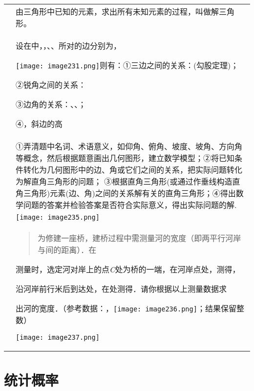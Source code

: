 \begin{longtable}[]{@{}ll@{}}
\toprule
\endhead
&
由三角形中已知的元素，求出所有未知元素的过程，叫做解三角形。\tabularnewline
\begin{minipage}[t]{0.47\columnwidth}\raggedright
\strut
\end{minipage} & \begin{minipage}[t]{0.47\columnwidth}\raggedright
设在中，，、、所对的边分别为，

\texttt{[image: image231.png]}则有：①三边之间的关系：(勾股定理)；

②锐角之间的关系：　

③边角的关系：、、；

④，斜边的高~\strut
\end{minipage}\tabularnewline
&
①弄清题中名词、术语意义，如仰角、俯角、坡度、坡角、方向角等概念，然后根据题意画出几何图形，建立数学模型；②将已知条件转化为几何图形中的边、角或它们之间的关系，把实际问题转化为解直角三角形的问题；
③根据直角三角形(或通过作垂线构造直角三角形)元素(边、角)之间的关系解有关的直角三角形；④得出数学问题的答案并检验答案是否符合实际意义，得出实际问题的解.
~\tabularnewline
&
\texttt{[image: image235.png]}\tabularnewline
\begin{minipage}[t]{0.47\columnwidth}\raggedright
\strut
\end{minipage} & \begin{minipage}[t]{0.47\columnwidth}\raggedright
\begin{quote}
为修建一座桥，建桥过程中需测量河的宽度（即两平行河岸与间的距离）．在
\end{quote}

测量时，选定河对岸上的点\emph{C}处为桥的一端，在河岸点处，测得，

沿河岸前行米后到达处，在处测得．请你根据以上测量数据求

出河的宽度．（参考数据：，\texttt{[image: image236.png]}；结果保留整数）

\texttt{[image: image237.png]}\strut
\end{minipage}\tabularnewline
\bottomrule
\end{longtable}

\hypertarget{ux7edfux8ba1ux6982ux7387}{%
\section{\texorpdfstring{
统计概率}{ 统计概率}}\label{ux7edfux8ba1ux6982ux7387}}

